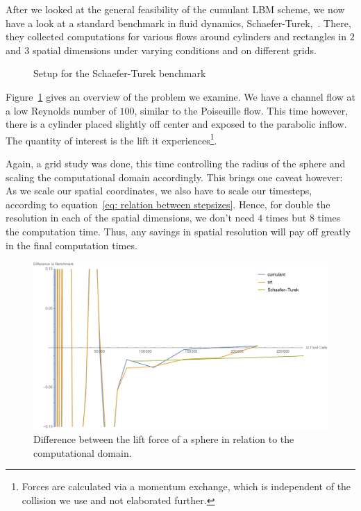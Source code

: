 After we looked at the general feasibility of the cumulant LBM scheme, we now have a look at a standard benchmark in fluid dynamics, Schaefer-Turek,~\cite{schafer1996benchmark}.
There, they collected computations for various flows around cylinders and rectangles in $2$ and $3$ spatial dimensions under varying conditions and on different grids.

\begin{figure}
  \centering
  
  \caption{Setup for the Schaefer-Turek benchmark}
\label{fig: schaeferTurek}
\end{figure}

Figure~\ref{fig: schaeferTurek} gives an overview of the problem we examine.
We have a channel flow at a low Reynolds number of $100$, similar to the Poiseuille flow.
This time however, there is a cylinder placed slightly off center and exposed to the parabolic inflow.
The quantity of interest is the lift it experiences\footnote{Forces are calculated via a momentum exchange, which is independent of the collision we use and not elaborated further.}.

Again, a grid study was done, this time controlling the radius of the sphere and scaling the computational domain accordingly.
This brings one caveat however:
As we scale our spatial coordinates, we also have to scale our timesteps, according to equation~\eqref{eq: relation between stepsizes}.
Hence, for double the resolution in each of the spatial dimensions, we don't need $4$ times but $8$ times the computation time.
Thus, any savings in spatial resolution will pay off greatly in the final computation times.


\begin{figure}
  \centering
  \includegraphics[width=\linewidth]{../figures/schaeferTurekLift_nrFluidVsDiff.pdf} %
  \caption{Difference between the lift force of a sphere in relation to the computational domain.}
\label{fig: schaefer turek nrFluidVsDiff}
\end{figure}

